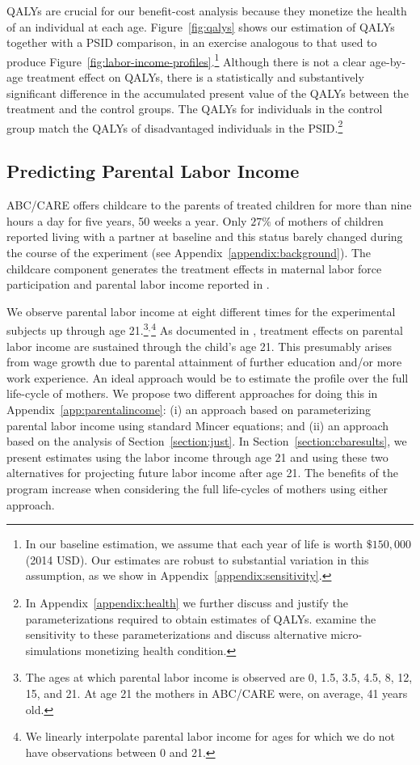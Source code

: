 QALYs are crucial for our benefit-cost analysis because they monetize the health of an individual at each age. Figure~\ref{fig:qalys} shows our estimation of QALYs together with a PSID comparison, in an exercise analogous to that used to produce Figure~\ref{fig:labor-income-profiles}.\footnote{In our baseline estimation, we assume that each year of life is worth  $\$150,000$ (2014 USD). Our estimates are robust to substantial variation in this assumption, as we show in  Appendix~\ref{appendix:sensitivity}.} Although there is not a clear age-by-age treatment effect on QALYs, there is a statistically and substantively significant difference in the accumulated present value of the QALYs between the treatment and the control groups. The QALYs for individuals in the control group match the QALYs of disadvantaged individuals in the PSID.\footnote{In  Appendix~\ref{appendix:health} we further discuss and justify the parameterizations required to obtain estimates of QALYs. \citet{Goldman_etal_2015_Future-America-Model} examine the sensitivity to these parameterizations and discuss alternative micro-simulations monetizing health condition.}

\subsection{Predicting Parental Labor Income} \label{section:pincome}

ABC/CARE offers childcare to the parents of treated children for more than nine hours a day for five years, 50 weeks a year. Only $27\%$ of mothers of children reported living with a partner at baseline and this status barely changed during the course of the experiment (see Appendix~\ref{appendix:background}). The childcare component generates the treatment effects in maternal labor force participation and parental labor income reported in \cite{Garcia_Ziff_2017_Gender-Diff_UNPUBLISHED}.

We observe parental labor income at eight different times for the experimental subjects up through age 21.\footnote{The ages at which parental labor income is observed are 0, 1.5, 3.5, 4.5, 8, 12, 15, and 21. At age 21 the mothers in ABC/CARE were, on average, 41 years old.}$^,$\footnote{We linearly interpolate parental labor income for ages for which we do not have observations between 0 and 21.} As documented in \cite{Garcia_Ziff_2017_Gender-Diff_UNPUBLISHED}, treatment effects on parental labor income are sustained through the child's age 21. This presumably arises from wage growth due to parental attainment of further education and/or more work experience. An ideal approach would be to estimate the profile over the full life-cycle of mothers. We propose two different approaches for doing this in Appendix~\ref{app:parentalincome}: (i) an approach based on parameterizing parental labor income using standard Mincer equations; and (ii) an approach based on the analysis of Section~\ref{section:just}. In Section~\ref{section:cbaresults}, we present estimates using the labor income through age 21 and using these two alternatives for projecting future labor income after age 21. The benefits of the program increase when considering the full life-cycles of mothers using either approach.

